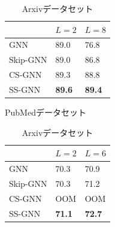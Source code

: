 \documentclass[a4j,twocolumn]{jsarticle}
\begin{document}
\begin{table}[!h]
  \begin{minipage}[!h]{.23\textwidth}
    \begin{center}
      \begin{tabular}{|l|l|l|}
        \hline
        \multicolumn{1}{|c|}{} & \multicolumn{1}{c|}{$L=2$} & \multicolumn{1}{c|}{$L=8$} \\ \hline
        GNN                    & 89.0                       & 76.8                       \\ \hline
        Skip-GNN               & 89.0                       & 86.8                       \\ \hline
        CS-GNN                 & 89.3                       & 88.8                       \\ \hline
        SS-GNN                 & \bf{89.6}                  & \bf{89.4}                  \\ \hline
      \end{tabular}
    \end{center}
    \vspace{-3mm}
    \caption{PubMedデータセット}
    \label{table_pubmed}
  \end{minipage}
  \hfill
  \begin{minipage}[!h]{.23\textwidth}
    \begin{center}
      \begin{tabular}{|l|l|l|}
        \hline
        \multicolumn{1}{|c|}{} & \multicolumn{1}{c|}{$L=2$} & \multicolumn{1}{c|}{$L=6$} \\ \hline
        GNN                    & 70.3                       & 70.9                       \\ \hline
        Skip-GNN               & 70.3                       & 71.2                       \\ \hline
        CS-GNN                 & OOM                        & OOM                        \\ \hline
        SS-GNN                 & \bf{71.1}                  & \bf{72.7}                  \\ \hline
      \end{tabular}
    \end{center}
    \vspace{-3mm}
    \caption{Arxivデータセット}
    \label{table_arxiv}
  \end{minipage}
\end{table}
\end{document}
